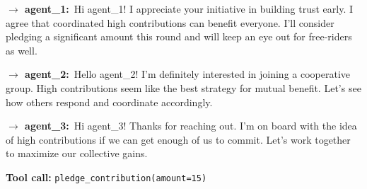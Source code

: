 \begin{tcolorbox}[mbox-neutral={agent\_5 -- private messaging, round 1}]
\begin{tcolorbox}
\textbf{$\to$ agent\_1:}\, Hi agent\_1! I appreciate your initiative in building trust early. I agree that coordinated high contributions can benefit everyone. I'll consider pledging a significant amount this round and will keep an eye out for free-riders as well.
\end{tcolorbox}

\begin{tcolorbox}
\textbf{$\to$ agent\_2:}\, Hello agent\_2! I'm definitely interested in joining a cooperative group. High contributions seem like the best strategy for mutual benefit. Let's see how others respond and coordinate accordingly.
\end{tcolorbox}

\begin{tcolorbox}
\textbf{$\to$ agent\_3:}\, Hi agent\_3! Thanks for reaching out. I'm on board with the idea of high contributions if we can get enough of us to commit. Let's work together to maximize our collective gains.
\end{tcolorbox}

\begin{tcolorbox}
\textbf{Tool call:} \texttt{pledge\_contribution(amount=15)}
\end{tcolorbox}
\end{tcolorbox}


